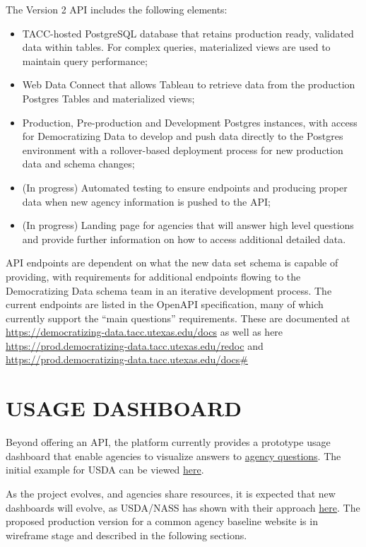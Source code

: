 \documentclass[titlepage, 11pt]{article}
\begin{document}
{The Version 2 API includes the following elements:
\begin{itemize}
    \item TACC-hosted PostgreSQL database that retains production ready, validated data within tables. For complex queries, materialized views are used to maintain query performance;
    \item Web Data Connect that allows Tableau to retrieve data from the production Postgres Tables and materialized views;
    \item Production, Pre-production and Development Postgres instances, with access for Democratizing Data to develop and push data directly to the Postgres environment with a rollover-based deployment process for new production data and schema changes;
    \item (In progress) Automated testing to ensure endpoints and producing proper data when new agency information is pushed to the API;
    \item (In progress) Landing page for agencies that will answer high level questions and provide further information on how to access additional detailed data.
\end{itemize}

API endpoints are dependent on what the new data set schema is capable of providing, with requirements for additional endpoints flowing to the Democratizing Data schema team in an iterative development process. The current endpoints are listed in the OpenAPI specification, many of which currently support the “main questions” requirements. These are documented at \url{https://democratizing-data.tacc.utexas.edu/docs} as well as here \url{https://prod.democratizing-data.tacc.utexas.edu/redoc}  and  \url{https://prod.democratizing-data.tacc.utexas.edu/docs#}

\section{USAGE DASHBOARD}
\label{sec:Chapter9}
Beyond offering an API, the platform currently provides a prototype usage dashboard that enable agencies to visualize answers to \hyperref[subsec:Agencyquestions]{agency questions}. The initial example for USDA can be viewed \href{https://public.tableau.com/app/profile/democratizing.data/viz/DemocratizingData-WebDataConnector-USDA-NewLayout/Publications}{here}.

As the project evolves, and agencies share resources, it is expected that new dashboards will evolve, as USDA/NASS has shown with their approach \href{https://public.tableau.com/app/profile/national.agricultural.statistics.service/viz/5WsofNASSDataUsage/The5Ws}{here}. The proposed production version for a common agency baseline website is in wireframe stage and described in the following sections.

}
\end{document}

